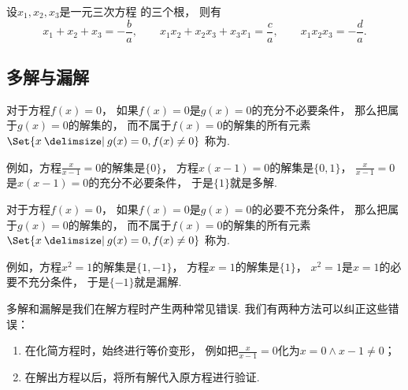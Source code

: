 \begin{theorem}[韦达定理]\label{theorem:一元三次方程.韦达定理}
设\(x_1,x_2,x_3\)是一元三次方程  的三个根，
则有\begin{equation*}
	x_1 + x_2 + x_3 = -\frac{b}{a},
	\qquad
	x_1 x_2 + x_2 x_3 + x_3 x_1 = \frac{c}{a},
	\qquad
	x_1 x_2 x_3 = -\frac{d}{a}.
\end{equation*}
\end{theorem}

\subsection{多解与漏解}
对于方程\(f(x) = 0\)，
如果\(f(x) = 0\)是\(g(x) = 0\)的充分不必要条件，
那么把属于\(g(x) = 0\)的解集的，
而不属于\(f(x) = 0\)的解集的所有元素
\(\Set{ x \given g(x) = 0, f(x) \neq 0 }\)
称为.

例如，方程\(\frac{x}{x-1} = 0\)的解集是\(\{0\}\)，
方程\(x(x-1) = 0\)的解集是\(\{0,1\}\)，
\(\frac{x}{x-1} = 0\)是\(x(x-1) = 0\)的充分不必要条件，
于是\(\{1\}\)就是多解.

对于方程\(f(x) = 0\)，
如果\(f(x) = 0\)是\(g(x) = 0\)的必要不充分条件，
那么把属于\(g(x) = 0\)的解集的，
而不属于\(f(x) = 0\)的解集的所有元素
\(\Set{ x \given g(x) = 0, f(x) \neq 0 }\)
称为.

例如，方程\(x^2 = 1\)的解集是\(\{1,-1\}\)，
方程\(x = 1\)的解集是\(\{1\}\)，
\(x^2 = 1\)是\(x = 1\)的必要不充分条件，
于是\(\{-1\}\)就是漏解.

多解和漏解是我们在解方程时产生两种常见错误.
我们有两种方法可以纠正这些错误：\begin{enumerate}
	\item 在化简方程时，始终进行等价变形，
	例如把\(\frac{x}{x-1} = 0\)化为\(x = 0 \land x-1 \neq 0\)；

	\item 在解出方程以后，将所有解代入原方程进行验证.
\end{enumerate}
